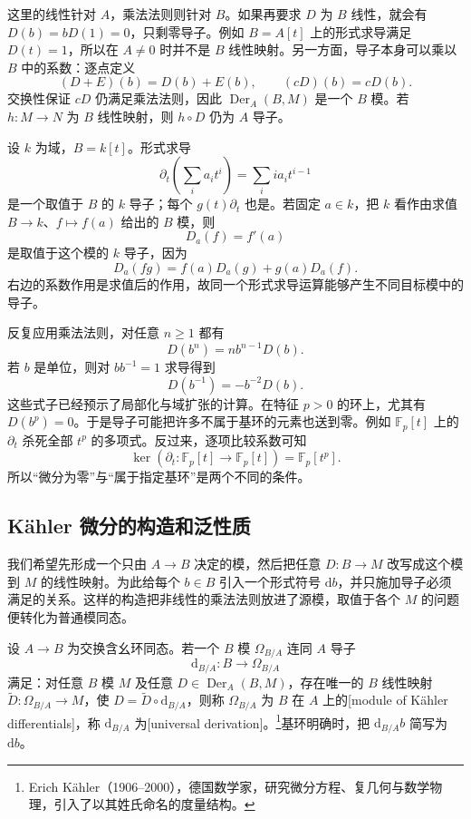 这里的线性针对 \(A\)，乘法法则则针对 \(B\)。如果再要求 \(D\) 为 \(B\) 线性，就会有 \(D(b)=bD(1)=0\)，只剩零导子。例如 \(B=A[t]\) 上的形式求导满足 \(D(t)=1\)，所以在 \(A\ne0\) 时并不是 \(B\) 线性映射。另一方面，导子本身可以乘以 \(B\) 中的系数：逐点定义
\[
	(D+E)(b)=D(b)+E(b),\qquad
	(cD)(b)=cD(b).
\]
交换性保证 \(cD\) 仍满足乘法法则，因此 \(\operatorname{Der}_A(B,M)\) 是一个 \(B\) 模。若 \(h:M\to N\) 为 \(B\) 线性映射，则 \(h\circ D\) 仍为 \(A\) 导子。

\begin{example}\label{g5:exm:derivation-coefficients}
	设 \(k\) 为域，\(B=k[t]\)。形式求导
	\[
		\partial_t\!\left(\sum_i a_it^i\right)=\sum_i i a_it^{i-1}
	\]
	是一个取值于 \(B\) 的 \(k\) 导子；每个 \(g(t)\partial_t\) 也是。若固定 \(a\in k\)，把 \(k\) 看作由求值 \(B\to k\)、\(f\mapsto f(a)\) 给出的 \(B\) 模，则
	\[
		D_a(f)=f'(a)
	\]
	是取值于这个模的 \(k\) 导子，因为
	\[
		D_a(fg)=f(a)D_a(g)+g(a)D_a(f).
	\]
	右边的系数作用是求值后的作用，故同一个形式求导运算能够产生不同目标模中的导子。
\end{example}

反复应用乘法法则，对任意 \(n\geq1\) 都有
\[
	D(b^n)=n b^{n-1}D(b).
\]
若 \(b\) 是单位，则对 \(bb^{-1}=1\) 求导得到
\begin{equation}\label{g5:eq:derivative-inverse}
	D(b^{-1})=-b^{-2}D(b).
\end{equation}
这些式子已经预示了局部化与域扩张的计算。在特征 \(p>0\) 的环上，尤其有 \(D(b^p)=0\)。于是导子可能把许多不属于基环的元素也送到零。例如 \(\mathbb F_p[t]\) 上的 \(\partial_t\) 杀死全部 \(t^p\) 的多项式。反过来，逐项比较系数可知
\[
	\ker(\partial_t:\mathbb F_p[t]\to\mathbb F_p[t])
	=\mathbb F_p[t^p].
\]
所以“微分为零”与“属于指定基环”是两个不同的条件。

\subsection{Kähler 微分的构造和泛性质}
\label{g5:subsec:0501:02}

我们希望先形成一个只由 \(A\to B\) 决定的模，然后把任意 \(D:B\to M\) 改写成这个模到 \(M\) 的线性映射。为此给每个 \(b\in B\) 引入一个形式符号 \(\mathrm{d}b\)，并只施加导子必须满足的关系。这样的构造把非线性的乘法法则放进了源模，取值于各个 \(M\) 的问题便转化为普通模同态。

\begin{definition}\label{g5:def:kahler-differentials}
	设 \(A\to B\) 为交换含幺环同态。若一个 \(B\) 模 \(\Omega_{B/A}\) 连同 \(A\) 导子
	\[
		\mathrm{d}_{B/A}:B\longrightarrow\Omega_{B/A}
	\]
	满足：对任意 \(B\) 模 \(M\) 及任意 \(D\in\operatorname{Der}_A(B,M)\)，存在唯一的 \(B\) 线性映射 \(\widetilde D:\Omega_{B/A}\to M\)，使 \(D=\widetilde D\circ\mathrm{d}_{B/A}\)，则称 \(\Omega_{B/A}\) 为 \(B\) 在 \(A\) 上的[module of Kähler differentials]，称 \(\mathrm{d}_{B/A}\) 为[universal derivation]。\footnote{Erich Kähler（1906--2000），德国数学家，研究微分方程、复几何与数学物理，引入了以其姓氏命名的度量结构。}基环明确时，把 \(\mathrm{d}_{B/A}b\) 简写为 \(\mathrm{d}b\)。
\end{definition}

